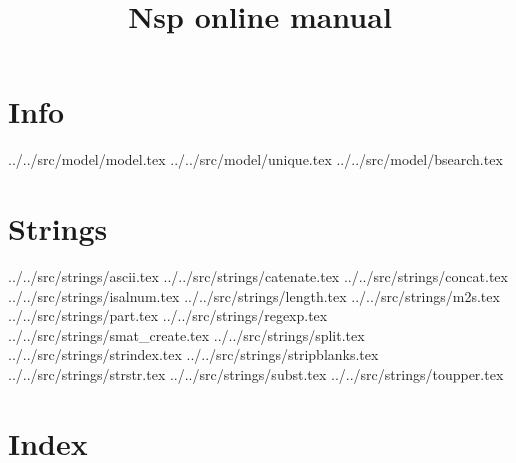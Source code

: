 \documentclass[11pt]{book}
\title{Nsp online manual}
\def\dir{../}
\begin{document}
\maketitle

\tableofcontents

\chapter{Info}

 \dir ../src/model/model.tex 
 \dir ../src/model/unique.tex 
 \dir ../src/model/bsearch.tex 

\chapter{Strings}

 \dir ../src/strings/ascii.tex
 \dir ../src/strings/catenate.tex
 \dir ../src/strings/concat.tex
 \dir ../src/strings/isalnum.tex
 \dir ../src/strings/length.tex
 \dir ../src/strings/m2s.tex
 \dir ../src/strings/part.tex
 \dir ../src/strings/regexp.tex
 \dir ../src/strings/smat_create.tex
 \dir ../src/strings/split.tex
 \dir ../src/strings/strindex.tex
 \dir ../src/strings/stripblanks.tex
 \dir ../src/strings/strstr.tex
 \dir ../src/strings/subst.tex
 \dir ../src/strings/toupper.tex

\chapter{Index}

\printindex
\end{document}
